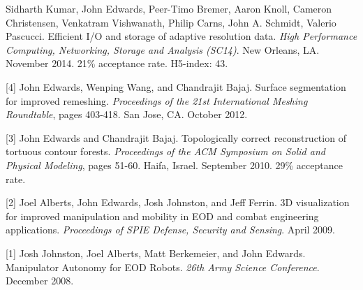 \documentclass[margin,line]{res}
\newcommand{\pubunder}[1]{#1}
\newcommand{\cnum}[1]{[#1]}
\begin{document}
\begin{resume}
\cnum{5} Sidharth Kumar, \pubunder{John Edwards}, Peer-Timo Bremer, Aaron Knoll, Cameron Christensen, Venkatram Vishwanath, Philip Carns, John A. Schmidt, Valerio Pascucci. Efficient I/O and storage of adaptive resolution data. \textit{High Performance Computing, Networking, Storage and Analysis (SC14)}. New Orleans, LA. November 2014. 21\% acceptance rate. H5-index: 43.

\cnum{4} \pubunder{John Edwards}, Wenping Wang, and Chandrajit Bajaj. Surface segmentation for improved remeshing. \textit{Proceedings of the 21st International Meshing Roundtable}, pages 403-418. San Jose, CA. October 2012.

\cnum{3} \pubunder{John Edwards} and Chandrajit Bajaj. Topologically correct reconstruction of tortuous contour forests. \textit{Proceedings of the ACM Symposium on Solid and Physical Modeling}, pages 51-60. Haifa, Israel. September 2010. 29\% acceptance rate.

\cnum{2} Joel Alberts, \pubunder{John Edwards}, Josh Johnston, and Jeff Ferrin. 3D visualization for improved manipulation and mobility in EOD and combat engineering applications. \textit{Proceedings of SPIE Defense, Security and Sensing}. April 2009.

\cnum{1} Josh Johnston, Joel Alberts, Matt Berkemeier, and \pubunder{John Edwards}. Manipulator Autonomy for EOD Robots. \textit{26th Army Science Conference}. December 2008.





\end{resume}
\end{document}
